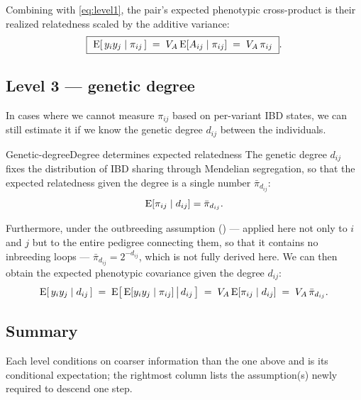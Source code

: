 \documentclass[12pt]{article}
\begin{document}
Combining with \eqref{eq:level1}, the pair's expected phenotypic cross-product is their realized relatedness scaled by the additive variance:
\begin{equation}\label{eq:level2}
    \boxed{\ \mathrm{E}[\,y_i y_j \mid \pi_{ij}\,] \;=\; V_A\,\mathrm{E}[A_{ij}\mid\pi_{ij}] \;=\; V_A\,\pi_{ij}\ } .
\end{equation}

\subsection{Level 3 --- genetic degree}
In cases where we cannot measure $\pi_{ij}$ based on per-variant IBD states, we can still estimate it if we know the genetic degree $d_{ij}$ between the individuals.

\begin{assumption}{Genetic-degree}{Degree determines expected relatedness}
The genetic degree $d_{ij}$ fixes the distribution of IBD sharing through Mendelian segregation, so that the expected relatedness given the degree is a single number $\bar\pi_{d_{ij}}$:
$$ \mathrm{E}[\pi_{ij}\mid d_{ij}] = \bar\pi_{d_{ij}} . $$
\end{assumption}

Furthermore, under the outbreeding assumption () --- applied here not only to $i$ and $j$ but to the entire pedigree connecting them, so that it contains no inbreeding loops --- $\bar\pi_{d_{ij}} = 2^{-d_{ij}}$, which is not fully derived here.
We can then obtain the expected phenotypic covariance given the degree $d_{ij}$:
\begin{equation}\label{eq:level3}
    \mathrm{E}[\,y_i y_j \mid d_{ij}\,] \;=\; \mathrm{E}\big[\,\mathrm{E}[y_i y_j\mid \pi_{ij}]\,\big|\, d_{ij}\,\big] \;=\; V_A\, \mathrm{E}[\pi_{ij}\mid d_{ij}] \;=\; V_A\,\bar\pi_{d_{ij}} .
\end{equation}

\subsection{Summary}
Each level conditions on coarser information than the one above and is its conditional expectation; the rightmost column lists the assumption(s) newly required to descend one step.
\end{document}
